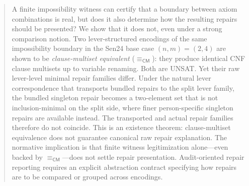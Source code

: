 \begin{abstract}
A finite impossibility witness can certify that a boundary between axiom combinations is real, but does it also determine how the resulting repairs should be presented?
We show that it does not, even under a strong comparison notion.
Two lever-structured encodings of the same impossibility boundary in the Sen24 base case \((n,m)=(2,4)\) are shown to be \emph{clause-multiset equivalent} ($\equiv_{\mathsf{CM}}$): they produce identical CNF clause multisets up to variable renaming.
Both are UNSAT.
Yet their raw lever-level minimal repair families differ.
Under the natural lever correspondence that transports bundled repairs to the split lever family, the bundled singleton repair becomes a two-element set that is not inclusion-minimal on the split side, where finer person-specific singleton repairs are available instead.
The transported and actual repair families therefore do not coincide.
This is an existence theorem: clause-multiset equivalence does not guarantee canonical raw repair explanation.
The normative implication is that finite witness legitimization alone---even backed by $\equiv_{\mathsf{CM}}$---does not settle repair presentation.
Audit-oriented repair reporting requires an explicit abstraction contract specifying how repairs are to be compared or grouped across encodings.
\end{abstract}
